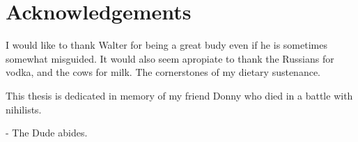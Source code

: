 \chapter{Acknowledgements}

I would like to thank Walter for being a great budy even if he is sometimes somewhat misguided. It would also seem apropiate to thank the Russians for vodka, and the cows for milk. The cornerstones of my dietary sustenance.

This thesis is dedicated in memory of my friend Donny who died in a battle with nihilists.

- The Dude abides.
